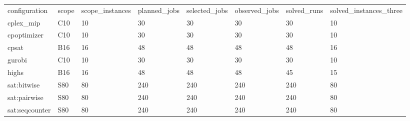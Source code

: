 \begin{tabular}{llllllll}
\hline
configuration & scope & scope\_instances & planned\_jobs & selected\_jobs & observed\_jobs & solved\_runs & solved\_instances\_three \\
cplex\_mip & C10 & 10 & 30 & 30 & 30 & 30 & 10 \\
cpoptimizer & C10 & 10 & 30 & 30 & 30 & 30 & 10 \\
cpsat & B16 & 16 & 48 & 48 & 48 & 48 & 16 \\
gurobi & C10 & 10 & 30 & 30 & 30 & 30 & 10 \\
highs & B16 & 16 & 48 & 48 & 48 & 45 & 15 \\
sat:bitwise & S80 & 80 & 240 & 240 & 240 & 240 & 80 \\
sat:pairwise & S80 & 80 & 240 & 240 & 240 & 240 & 80 \\
sat:seqcounter & S80 & 80 & 240 & 240 & 240 & 240 & 80 \\
\hline
\end{tabular}
